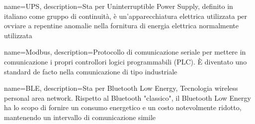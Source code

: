 {
	name={UPS},
	description={Sta per Uninterruptible Power Supply, definito in italiano come gruppo di continuità, è un'apparecchiatura elettrica utilizzata per ovviare a repentine anomalie nella fornitura di energia elettrica normalmente utilizzata}
}

{
	name={Modbus},
	description={Protocollo di comunicazione seriale per mettere in comunicazione i propri controllori logici programmabili (PLC). È diventato uno standard de facto nella comunicazione di tipo industriale}
}

{
	name={BLE},
	description={Sta per Bluetooth Low Energy, Tecnologia wireless personal area network. Rispetto al Bluetooth "classico", il Bluetooth Low Energy ha lo scopo di fornire un consumo energetico e un costo notevolmente ridotto, mantenendo un intervallo di comunicazione simile}
}



